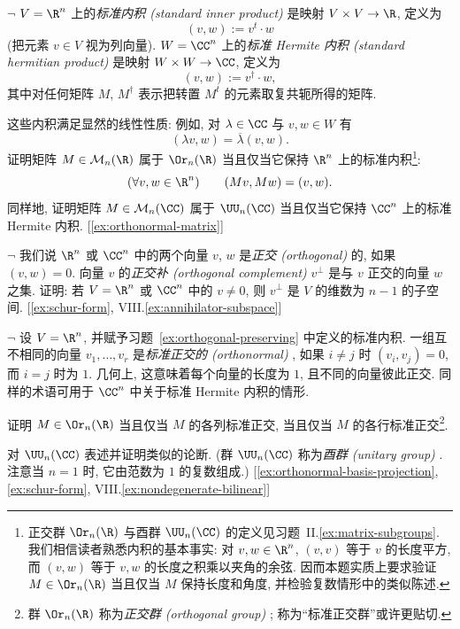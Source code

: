 \begin{prob}\label{ex:orthogonal-preserving}
$\neg$ $V=\R^n$ 上的\emph{标准内积 (standard inner product)}
是映射 $V\times V\to\R$, 定义为
\[
(v,w):=v^t\cdot w
\]
(把元素 $v\in V$ 视为列向量). $W=\CC^n$ 上的\emph{标准 Hermite 内积 (standard hermitian product)}
是映射 $W\times W\to\CC$, 定义为
\[
(v,w):=v^{\dagger}\cdot w,
\]
其中对任何矩阵 $M$, $M^{\dagger}$ 表示把转置 $M^t$ 的元素取复共轭所得的矩阵.

这些内积满足显然的线性性质: 例如, 对 $\lambda\in\CC$ 与 $v,w\in W$ 有
\[
(\lambda v,w)=\overline{\lambda}(v,w).
\]
证明矩阵 $M\in\mathcal{M}_n(\R)$ 属于 $\Or_n(\R)$ 当且仅当它保持 $\R^n$ 上的标准内积\footnote{正交群 $\Or_n(\R)$ 与酉群 $\UU_n(\CC)$ 的定义见习题~II.\ref{ex:matrix-subgroups}. 我们相信读者熟悉内积的基本事实: 对 $v,w\in\R^n$, $(v,v)$ 等于 $v$ 的长度平方, 而 $(v,w)$ 等于 $v,w$ 的长度之积乘以夹角的余弦. 因而本题实质上要求验证 $M\in\Or_n(\R)$ 当且仅当 $M$ 保持长度和角度, 并检验复数情形中的类似陈述.}:
\[
(\forall v,w\in\R^n)\qquad (Mv,Mw)=(v,w).
\]
同样地, 证明矩阵 $M\in\mathcal{M}_n(\CC)$ 属于 $\UU_n(\CC)$ 当且仅当它保持 $\CC^n$ 上的标准 Hermite 内积. [\ref{ex:orthonormal-matrix}]
\end{prob}

\begin{prob}\label{ex:orthogonal-complement}
$\neg$ 我们说 $\R^n$ 或 $\CC^n$ 中的两个向量 $v$, $w$ 是\emph{正交 (orthogonal)}
的, 如果 $(v,w)=0$. 向量 $v$ 的\emph{正交补 (orthogonal complement)}
$v^\perp$ 是与 $v$ 正交的向量 $w$ 之集. 证明: 若 $V=\R^n$ 或 $\CC^n$ 中的 $v\neq0$, 则 $v^\perp$ 是 $V$ 的维数为 $n-1$ 的子空间. [\ref{ex:schur-form}, VIII.\ref{ex:annihilator-subspace}]
\end{prob}

\begin{prob}\label{ex:orthonormal-matrix}
$\neg$ 设 $V=\R^n$, 并赋予习题~\ref{ex:orthogonal-preserving} 中定义的标准内积. 一组互不相同的向量 $v_1,\ldots,v_r$ 是\emph{标准正交的 (orthonormal)}
, 如果 $i\neq j$ 时 $(v_i,v_j)=0$, 而 $i=j$ 时为 $1$. 几何上, 这意味着每个向量的长度为 $1$, 且不同的向量彼此正交. 同样的术语可用于 $\CC^n$ 中关于标准 Hermite 内积的情形.

证明 $M\in\Or_n(\R)$ 当且仅当 $M$ 的各列标准正交, 当且仅当 $M$ 的各行标准正交\footnote{群 $\Or_n(\R)$ 称为\emph{正交群 (orthogonal group)}
; 称为``标准正交群''或许更贴切.}.

对 $\UU_n(\CC)$ 表述并证明类似的论断. (群 $\UU_n(\CC)$ 称为\emph{酉群 (unitary group)}
. 注意当 $n=1$ 时, 它由范数为 $1$ 的复数组成.) [\ref{ex:orthonormal-basis-projection}, \ref{ex:schur-form}, VIII.\ref{ex:nondegenerate-bilinear}]
\end{prob}

